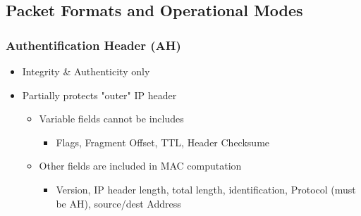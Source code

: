 \subsection{Packet Formats and Operational Modes}
\subsubsection{Authentification Header (AH)}
\begin{itemize}
  \item Integrity \& Authenticity only
  \item Partially protects "outer" IP header
    \begin{itemize}
      \item Variable fields cannot be includes
        \begin{itemize}
          \item Flags, Fragment Offset, TTL, Header Checksume
        \end{itemize}
      \item Other fields are included in MAC computation
        \begin{itemize}
          \item Version, IP header length, total length, identification, Protocol (must be AH), source/dest Address
        \end{itemize}
    \end{itemize}
\end{itemize}
